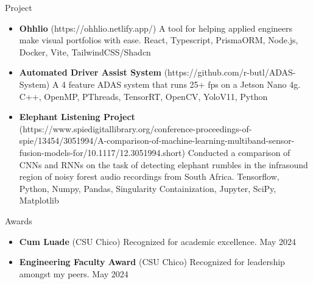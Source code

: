 \documentclass[]{mcdowellcv}
\begin{document}
\begin{cvsection}{Project}
	\begin{cvsubsection}{}{}{}
		\begin{itemize}
			\setlength\itemsep{3pt}
			\item \textbf{Ohhlio} (https://ohhlio.netlify.app/)  A tool for helping applied engineers make visual portfolios with ease. React, Typescript, PrismaORM, Node.js, Docker, Vite, TailwindCSS/Shadcn
			\item \textbf{Automated Driver Assist System} (https://github.com/r-butl/ADAS-System)  A 4 feature ADAS system that runs 25+ fps on a Jetson Nano 4g. C++, OpenMP, PThreads, TensorRT, OpenCV, YoloV11, Python
			\item \textbf{Elephant Listening Project} (https://www.spiedigitallibrary.org/conference-proceedings-of-spie/13454/3051994/A-comparison-of-machine-learning-multiband-sensor-fusion-models-for/10.1117/12.3051994.short)  Conducted a comparison of CNNs and RNNs on the task of detecting elephant rumbles in the infrasound region of noisy forest audio recordings from South Africa. Tensorflow, Python, Numpy, Pandas, Singularity Containization, Jupyter, SciPy, Matplotlib
		\end{itemize}
	\end{cvsubsection}
\end{cvsection}
\begin{cvsection}{Awards}
	\begin{cvsubsection}{}{}{}
		\begin{itemize}
			\setlength\itemsep{3pt}
			\item \textbf{Cum Luade} (CSU Chico)  Recognized for academic excellence. May 2024
			\item \textbf{Engineering Faculty Award} (CSU Chico)  Recognized for leadership amongst my peers. May 2024
		\end{itemize}
	\end{cvsubsection}
\end{cvsection}
\ 
\end{document}
